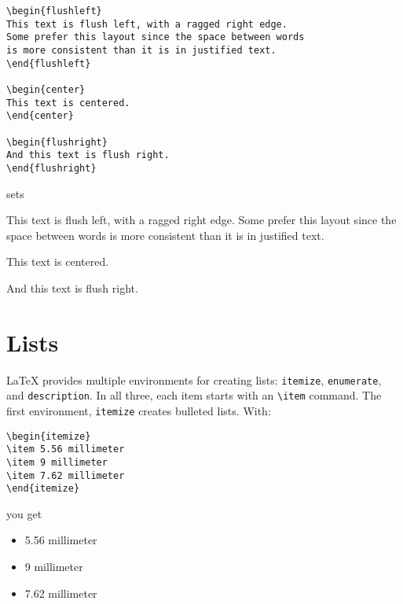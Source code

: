 \begin{leftfigure}
\begin{lstlisting}
\begin{flushleft}
This text is flush left, with a ragged right edge.
Some prefer this layout since the space between words
is more consistent than it is in justified text.
\end{flushleft}

\begin{center}
This text is centered.
\end{center}

\begin{flushright}
And this text is flush right.
\end{flushright}
\end{lstlisting}
\end{leftfigure}
sets
\begin{flushleftfigure}
\begin{minipage}{0.99\textwidth}
\lm%
\begin{flushleft}
This text is flush left, with a ragged right edge.
Some prefer this layout since the space between words
is more consistent than it is in justified text.
\end{flushleft}

\begin{center}
This text is centered.
\end{center}

\begin{flushright}
And this text is flush right.
\end{flushright}
\end{minipage}
\end{flushleftfigure}

\section{Lists}

\LaTeX{} provides multiple environments for creating lists:
\texttt{itemize}, \texttt{enumerate}, and \texttt{description}.
In all three, each item starts with an \verb|\item| command.
The first environment, \texttt{itemize} creates bulleted lists.
With:
\begin{leftfigure}
\begin{lstlisting}
\begin{itemize}
\item 5.56 millimeter
\item 9 millimeter
\item 7.62 millimeter
\end{itemize}
\end{lstlisting}
\end{leftfigure}
you get
\begin{leftfigure}
\lm%
\begin{itemize}[leftmargin=*]
\item 5.56 millimeter
\item 9 millimeter
\item 7.62 millimeter
\end{itemize}
\end{leftfigure}


